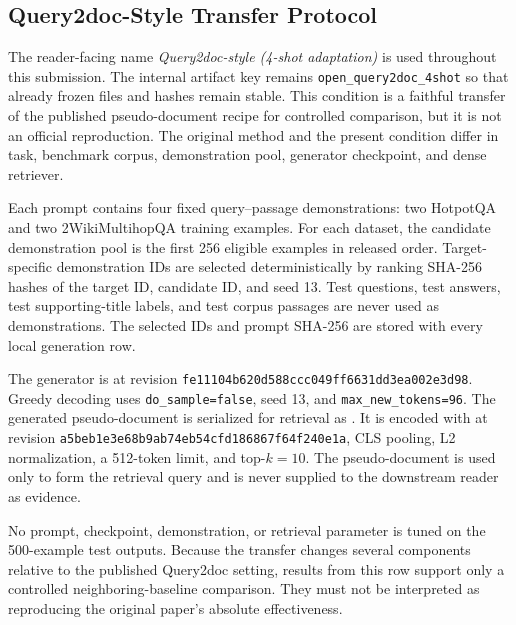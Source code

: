 \subsection{Query2doc-Style Transfer Protocol}
\label{supp:sec:query2doc_style_protocol}

The reader-facing name \emph{Query2doc-style (4-shot adaptation)} is used throughout this submission. The internal artifact key remains \texttt{open\_query2doc\_4shot} so that already frozen files and hashes remain stable. This condition is a faithful transfer of the published pseudo-document recipe for controlled comparison, but it is not an official reproduction. The original method and the present condition differ in task, benchmark corpus, demonstration pool, generator checkpoint, and dense retriever.

Each prompt contains four fixed query--passage demonstrations: two HotpotQA and two 2WikiMultihopQA training examples. For each dataset, the candidate demonstration pool is the first 256 eligible examples in released order. Target-specific demonstration IDs are selected deterministically by ranking SHA-256 hashes of the target ID, candidate ID, and seed 13. Test questions, test answers, test supporting-title labels, and test corpus passages are never used as demonstrations. The selected IDs and prompt SHA-256 are stored with every local generation row.

\begingroup\sloppy
The generator is  at revision
\texttt{fe11104b620d588ccc049ff6631dd3ea002e3d98}. Greedy decoding uses
\texttt{do\_sample=false}, seed 13, and \texttt{max\_new\_tokens=96}. The
generated pseudo-document is serialized for retrieval as
. It is encoded with
 at revision
\texttt{a5beb1e3e68b9ab74eb54cfd186867f64f240e1a}, CLS pooling, L2
normalization, a 512-token limit, and top-$k=10$. The pseudo-document is used
only to form the retrieval query and is never supplied to the downstream reader
as evidence.\par
\endgroup

No prompt, checkpoint, demonstration, or retrieval parameter is tuned on the 500-example test outputs. Because the transfer changes several components relative to the published Query2doc setting, results from this row support only a controlled neighboring-baseline comparison. They must not be interpreted as reproducing the original paper's absolute effectiveness.
